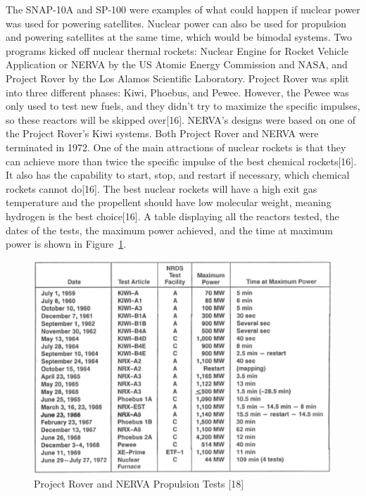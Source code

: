 \documentclass{article}
\begin{document}
    The SNAP-10A and SP-100 were examples of what could happen if nuclear power was used for powering satellites. Nuclear power can also be used for propulsion and powering satellites at the same time, which would be bimodal systems. Two programs kicked off nuclear thermal rockets: Nuclear Engine for Rocket Vehicle Application or NERVA by the US Atomic Energy Commission and NASA, and Project Rover by the Los Alamos Scientific Laboratory. Project Rover was split into three different phases: Kiwi, Phoebus, and Pewee. However, the Pewee was only used to test new fuels, and they didn't try to maximize the specific impulses, so these reactors will be skipped over[16]. NERVA's designs were based on one of the Project Rover's Kiwi systems. Both Project Rover and NERVA were terminated in 1972. One of the main attractions of nuclear rockets is that they can achieve more than twice the specific impulse of the best chemical rockets[16]. It also has the capability to start, stop, and restart if necessary, which chemical rockets cannot do[16]. The best nuclear rockets will have a high exit gas temperature and the propellent should have low molecular weight, meaning hydrogen is the best choice[16]. A table displaying all the reactors tested, the dates of the tests, the maximum power achieved, and the time at maximum power is shown in Figure~\ref{appJ}.


\begin{figure}[]
	\centering
	\includegraphics[height=0.45\textheight]{fig/appJ}
	\caption[Project Rover and NERVA Propulsion Tests]{Project Rover and NERVA Propulsion Tests [18]}
	\label{appJ}
\end{figure}
\end{document}
